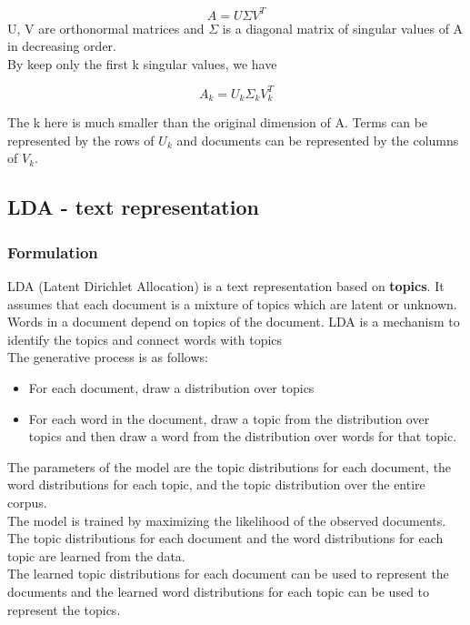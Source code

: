 \documentclass[12pt]{article}
\newcommand{\bold}[1]{\textbf{#1}}
\begin{document}
            \[
                A = U \Sigma V^{T}
            \]
            U, V are orthonormal matrices and $\Sigma$ is a diagonal matrix of 
            singular values of A in decreasing order.
            \\
            By keep only the first k singular values, we have

            \[
                A_k = U_k \Sigma_k V_k^{T}
            \]

            The k here is much smaller than the original dimension of A.
            Terms can be represented by the rows of $U_k$ and documents can be
            represented by the columns of $V_k$.
            
    \subsection{LDA - text representation}
        \subsubsection{Formulation}
            LDA (Latent Dirichlet Allocation) is a text representation based
            on \bold{topics}. It assumes that each document is a mixture of 
            topics which are latent or unknown. Words in a document depend on
            topics of the document. LDA is a mechanism to identify the topics
            and connect words with topics
            \\
            The generative process is as follows:
            \begin{itemize}
                \item For each document, draw a distribution over topics
                \item For each word in the document, draw a topic from the
                distribution over topics and then draw a word from the
                distribution over words for that topic.
            \end{itemize}
            The parameters of the model are the topic distributions for each
            document, the word distributions for each topic, and the topic
            distribution over the entire corpus.
            \\
            The model is trained by maximizing the likelihood of the observed
            documents. The topic distributions for each document and the word
            distributions for each topic are learned from the data.
            \\
            The learned topic distributions for each document can be used to
            represent the documents and the learned word distributions for each
            topic can be used to represent the topics.
            
\end{document}
